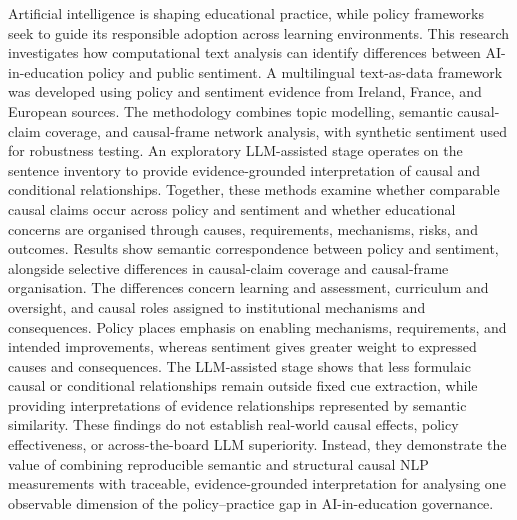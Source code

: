 \begin{abstracts}        

    
Artificial intelligence is shaping educational practice, while policy frameworks seek
to guide its responsible adoption across learning environments. This research
investigates how computational text analysis can identify differences between
AI-in-education policy and public sentiment. A multilingual text-as-data framework
was developed using policy and sentiment evidence from Ireland, France, and European
sources. The methodology combines topic modelling, semantic causal-claim coverage,
and causal-frame network analysis, with synthetic sentiment used for robustness
testing. An exploratory LLM-assisted stage operates on the sentence inventory to
provide evidence-grounded interpretation of causal and conditional relationships.
Together, these methods examine whether comparable causal claims occur across policy
and sentiment and whether educational concerns are organised through causes,
requirements, mechanisms, risks, and outcomes. Results show semantic correspondence
between policy and sentiment, alongside selective differences in causal-claim
coverage and causal-frame organisation. The differences concern learning and
assessment, curriculum and oversight, and causal roles assigned to institutional
mechanisms and consequences. Policy places emphasis on enabling mechanisms,
requirements, and intended improvements, whereas sentiment gives greater weight to
expressed causes and consequences. The LLM-assisted stage shows that less formulaic
causal or conditional relationships remain outside fixed cue extraction, while
providing interpretations of evidence relationships represented by semantic
similarity. These findings do not establish real-world causal effects, policy
effectiveness, or across-the-board LLM superiority. Instead, they demonstrate the
value of combining reproducible semantic and structural causal NLP measurements with
traceable, evidence-grounded interpretation for analysing one observable dimension of
the policy--practice gap in AI-in-education governance.

\end{abstracts}

